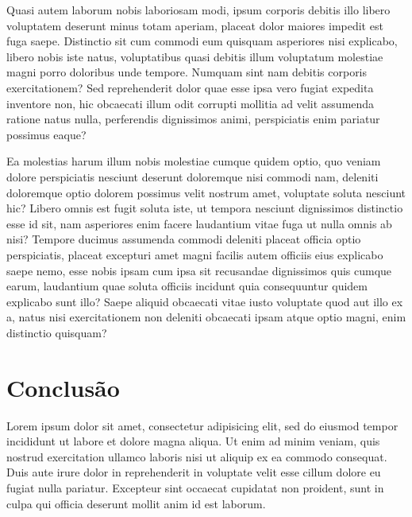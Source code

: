 \documentclass[
    12pt,               %
    openright,          %
    twoside,            %
    a4paper,            %
    chapter=TITLE,     %
    english,            %
    spanish,            %
    portuguese              %
    ]{abntex2}
\begin{document}
Quasi autem laborum nobis laboriosam modi, ipsum corporis debitis illo libero voluptatem deserunt minus totam aperiam, placeat dolor maiores impedit est fuga saepe. Distinctio sit cum commodi eum quisquam asperiores nisi explicabo, libero nobis iste natus, voluptatibus quasi debitis illum voluptatum molestiae magni porro doloribus unde tempore. Numquam sint nam debitis corporis exercitationem? Sed reprehenderit dolor quae esse ipsa vero fugiat expedita inventore non, hic obcaecati illum odit corrupti mollitia ad velit assumenda ratione natus nulla, perferendis dignissimos animi, perspiciatis enim pariatur possimus eaque?


Ea molestias harum illum nobis molestiae cumque quidem optio, quo veniam dolore perspiciatis nesciunt deserunt doloremque nisi commodi nam, deleniti doloremque optio dolorem possimus velit nostrum amet, voluptate soluta nesciunt hic? Libero omnis est fugit soluta iste, ut tempora nesciunt dignissimos distinctio esse id sit, nam asperiores enim facere laudantium vitae fuga ut nulla omnis ab nisi? Tempore ducimus assumenda commodi deleniti placeat officia optio perspiciatis, placeat excepturi amet magni facilis autem officiis eius explicabo saepe nemo, esse nobis ipsam cum ipsa sit recusandae dignissimos quis cumque earum, laudantium quae soluta officiis incidunt quia consequuntur quidem explicabo sunt illo? Saepe aliquid obcaecati vitae iusto voluptate quod aut illo ex a, natus nisi exercitationem non deleniti obcaecati ipsam atque optio magni, enim distinctio quisquam?


\chapter{Conclusão}

Lorem ipsum dolor sit amet, consectetur adipisicing elit, sed do eiusmod tempor incididunt ut labore et dolore magna aliqua. Ut enim ad minim veniam, quis nostrud exercitation ullamco laboris nisi ut aliquip ex ea commodo consequat. Duis aute irure dolor in reprehenderit in voluptate velit esse cillum dolore eu fugiat nulla pariatur. Excepteur sint occaecat cupidatat non proident, sunt in culpa qui officia deserunt mollit anim id est laborum.



\postextual
\end{document}
